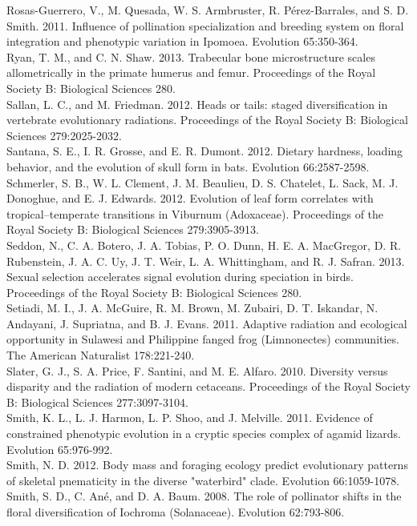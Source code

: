 \documentclass[a4paper,12pt]{article}
\begin{document}
Rosas-Guerrero, V., M. Quesada, W. S. Armbruster, R. Pérez-Barrales, and S. D. Smith. 2011. Influence of pollination specialization and breeding system on floral integration and phenotypic variation in Ipomoea. Evolution 65:350-364.\\
Ryan, T. M., and C. N. Shaw. 2013. Trabecular bone microstructure scales allometrically in the primate humerus and femur. Proceedings of the Royal Society B: Biological Sciences 280.\\
Sallan, L. C., and M. Friedman. 2012. Heads or tails: staged diversification in vertebrate evolutionary radiations. Proceedings of the Royal Society B: Biological Sciences 279:2025-2032.\\
Santana, S. E., I. R. Grosse, and E. R. Dumont. 2012. Dietary hardness, loading behavior, and the evolution of skull form in bats. Evolution 66:2587-2598.\\
Schmerler, S. B., W. L. Clement, J. M. Beaulieu, D. S. Chatelet, L. Sack, M. J. Donoghue, and E. J. Edwards. 2012. Evolution of leaf form correlates with tropical–temperate transitions in Viburnum (Adoxaceae). Proceedings of the Royal Society B: Biological Sciences 279:3905-3913.\\
Seddon, N., C. A. Botero, J. A. Tobias, P. O. Dunn, H. E. A. MacGregor, D. R. Rubenstein, J. A. C. Uy, J. T. Weir, L. A. Whittingham, and R. J. Safran. 2013. Sexual selection accelerates signal evolution during speciation in birds. Proceedings of the Royal Society B: Biological Sciences 280.\\
Setiadi, M. I., J. A. McGuire, R. M. Brown, M. Zubairi, D. T. Iskandar, N. Andayani, J. Supriatna, and B. J. Evans. 2011. Adaptive radiation and ecological opportunity in Sulawesi and Philippine fanged frog (Limnonectes) communities. The American Naturalist 178:221-240.\\
Slater, G. J., S. A. Price, F. Santini, and M. E. Alfaro. 2010. Diversity versus disparity and the radiation of modern cetaceans. Proceedings of the Royal Society B: Biological Sciences 277:3097-3104.\\
Smith, K. L., L. J. Harmon, L. P. Shoo, and J. Melville. 2011. Evidence of constrained phenotypic evolution in a cryptic species complex of agamid lizards. Evolution 65:976-992.\\
Smith, N. D. 2012. Body mass and foraging ecology predict evolutionary patterns of skeletal pnematicity in the diverse "waterbird" clade. Evolution 66:1059-1078.\\
Smith, S. D., C. An\'{e}, and D. A. Baum. 2008. The role of pollinator shifts in the floral diversification of Iochroma (Solanaceae). Evolution 62:793-806.\\
\end{document}
